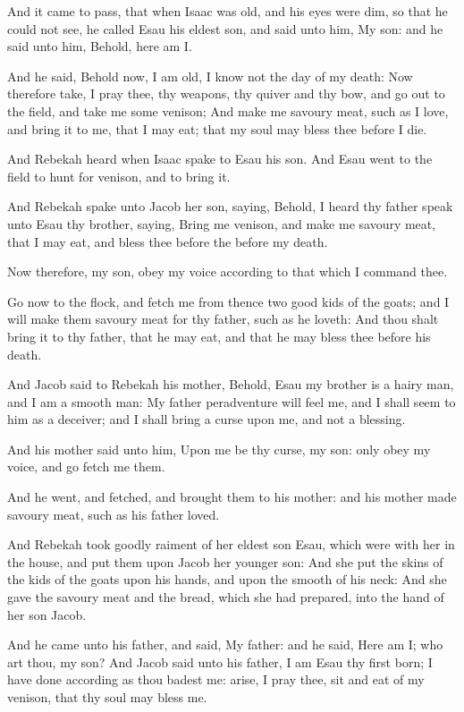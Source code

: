 \verse And it came to pass, that when Isaac was old, and his eyes were
dim, so that he could not see, he called Esau his eldest son, and said
unto him, My son: and he said unto him, Behold, here am I.

\verse And he said, Behold now, I am old, I know not the day of my
death: \verse Now therefore take, I pray thee, thy weapons, thy quiver
and thy bow, and go out to the field, and take me some venison; \verse
And make me savoury meat, such as I love, and bring it to me, that I
may eat; that my soul may bless thee before I die.

\verse And Rebekah heard when Isaac spake to Esau his son. And Esau went
to the field to hunt for venison, and to bring it.

\verse And Rebekah spake unto Jacob her son, saying, Behold, I heard thy
father speak unto Esau thy brother, saying, \verse Bring me venison, and
make me savoury meat, that I may eat, and bless thee before the \LORD
before my death.

\verse Now therefore, my son, obey my voice according to that which I
command thee.

\verse Go now to the flock, and fetch me from thence two good kids of
the goats; and I will make them savoury meat for thy father, such as
he loveth: \verse And thou shalt bring it to thy father, that he may
eat, and that he may bless thee before his death.

\verse And Jacob said to Rebekah his mother, Behold, Esau my brother is
a hairy man, and I am a smooth man: \verse My father peradventure will
feel me, and I shall seem to him as a deceiver; and I shall bring a
curse upon me, and not a blessing.

\verse And his mother said unto him, Upon me be thy curse, my son: only
obey my voice, and go fetch me them.

\verse And he went, and fetched, and brought them to his mother: and
his mother made savoury meat, such as his father loved.

\verse And Rebekah took goodly raiment of her eldest son Esau, which
were with her in the house, and put them upon Jacob her younger son:
\verse And she put the skins of the kids of the goats upon his hands,
and upon the smooth of his neck: \verse And she gave the savoury meat
and the bread, which she had prepared, into the hand of her son Jacob.

\verse And he came unto his father, and said, My father: and he said,
Here am I; who art thou, my son?  \verse And Jacob said unto his
father, I am Esau thy first born; I have done according as thou badest
me: arise, I pray thee, sit and eat of my venison, that thy soul may
bless me.

